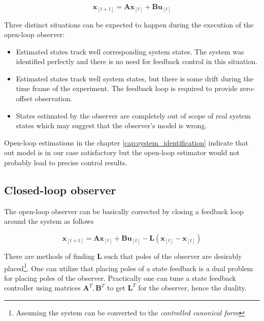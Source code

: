 \begin{equation}
\textbf{\^x}_{[t+1]} = \textbf{A}\textbf{\^x}_{[t]} + \textbf{B}\textbf{u}_{[t]}
\label{eq:openloop_observer}
\end{equation}

Three distinct situations can be expected to happen during the execution of the open-loop observer:

\begin{itemize}
\item Estimated states track well corresponding system states. The system was identified perfectly and there is no need for feedback control in this situation.
\item Estimated states track well system states, but there is some drift during the time frame of the experiment. The feedback loop is required to provide zero-offset observation.
\item States estimated by the observer are completely out of scope of real system states which may suggest that the observer's model is wrong.
\end{itemize}

Open-loop estimations in the chapter \ref{cap:system_identification} indicate that out model is in our case satisfactory but the open-loop estimator would not probably lead to precise control results.

\subsection{Closed-loop observer}

The open-loop observer can be basically corrected by closing a feedback loop around the system as follows

\begin{equation}
\textbf{\^x}_{[t+1]} = \textbf{A}\textbf{\^x}_{[t]} + \textbf{B}\textbf{u}_{[t]} - \textbf{L}\left(\textbf{x}_{[t]} - \textbf{\^x}_{[t]}\right)
\label{eq:closed_loop_observer}
\end{equation}

There are methods of finding $\textbf{L}$ such that poles of the observer are desirably placed\footnote{Assuming the system can be converted to the \textit{controlled canonical form}}. One can utilize that placing poles of a state feedback is a dual problem for placing poles of the observer. Practically one can tune a state feedback controller using matrices $\textbf{A}^T, \textbf{B}^T$ to get $\textbf{L}^T$ for the observer, hence the duality.

